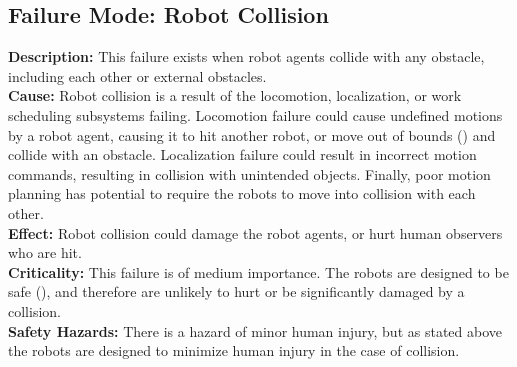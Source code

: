 \subsection{Failure Mode: Robot Collision}
\label{sec:sys_val_fm_collision}
\textbf{Description:} This failure exists when robot agents collide with any obstacle, including each other or external obstacles.\\
\textbf{Cause:} Robot collision is a result of the locomotion, localization, or work scheduling subsystems failing. Locomotion failure could cause undefined motions by a robot agent, causing it to hit another robot, or move out of bounds () and collide with an obstacle. Localization failure could result in incorrect motion commands, resulting in collision with unintended objects. Finally, poor motion planning has potential to require the robots to move into collision with each other.\\
\textbf{Effect:} Robot collision could damage the robot agents, or hurt human observers who are hit.\\
\textbf{Criticality:} This failure is of medium importance. The robots are designed to be safe (), and therefore are unlikely to hurt or be significantly damaged by a collision. \\
\textbf{Safety Hazards:} There is a hazard of minor human injury, but as stated above the robots are designed to minimize human injury in the case of collision.

